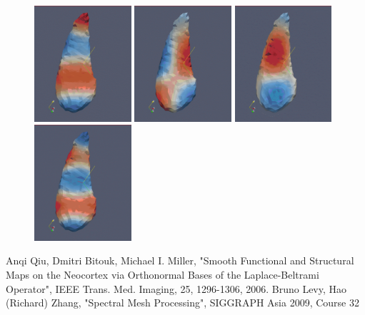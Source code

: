 \documentclass{InsightArticle}
\begin{document}
\begin{figure}
\includegraphics[width=0.32\textwidth]{SurfaceHarmonic_6.png}
\includegraphics[width=0.32\textwidth]{SurfaceHarmonic_7.png}
\includegraphics[width=0.32\textwidth]{SurfaceHarmonic_8.png}
\includegraphics[width=0.32\textwidth]{SurfaceHarmonic_9.png}
\label{fig:HippocampusSurfaceHarmonics}
\end{figure}




%
%


\begin{thebibliography}{100}
 Anqi Qiu, Dmitri Bitouk, Michael I. Miller,
"Smooth Functional and Structural Maps on the Neocortex via Orthonormal Bases
of the Laplace-Beltrami Operator",
IEEE Trans. Med. Imaging, 25, 1296-1306, 2006.
 Bruno Levy, Hao (Richard) Zhang,
"Spectral Mesh Processing", 
SIGGRAPH Asia 2009, Course 32

\end{thebibliography}
\end{document}
